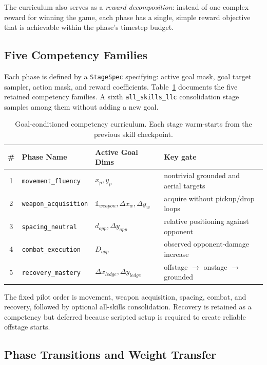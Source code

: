 \documentclass[11pt,a4paper]{article}
\begin{document}
The curriculum also serves as a \emph{reward decomposition}: instead of one complex reward for winning the game, each phase has a single, simple reward objective that is achievable within the phase's timestep budget.

\subsection{Five Competency Families}

Each phase is defined by a \texttt{StageSpec} specifying: active goal mask, goal target sampler, action mask, and reward coefficients.
Table~\ref{tab:curriculum} documents the five retained competency families. A sixth
\texttt{all\_skills\_llc} consolidation stage samples among them without adding a new goal.

\begin{table}[t]
\centering
\caption{Goal-conditioned competency curriculum. Each stage warm-starts from the previous skill checkpoint.}
\label{tab:curriculum}
\small
\begin{tabular}{@{}clp{3.4cm}p{3.0cm}@{}}
\toprule
\textbf{\#} & \textbf{Phase Name} & \textbf{Active Goal Dims} & \textbf{Key gate} \\
\midrule
1 & \texttt{movement\_fluency} & $x_p,y_p$ & nontrivial grounded and aerial targets \\
2 & \texttt{weapon\_acquisition} & $\mathbb{1}_{weapon},\Delta x_w,\Delta y_w$ & acquire without pickup/drop loops \\
3 & \texttt{spacing\_neutral} & $d_{opp},\Delta y_{opp}$ & relative positioning against opponent \\
4 & \texttt{combat\_execution} & $D_{opp}$ & observed opponent-damage increase \\
5 & \texttt{recovery\_mastery} & $\Delta x_{ledge},\Delta y_{ledge}$ & offstage $\rightarrow$ onstage $\rightarrow$ grounded \\
\bottomrule
\end{tabular}
\end{table}

The fixed pilot order is movement, weapon acquisition, spacing, combat, and recovery,
followed by optional all-skills consolidation. Recovery is retained as a competency but
deferred because scripted setup is required to create reliable offstage starts.

\subsection{Phase Transitions and Weight Transfer}
\end{document}
